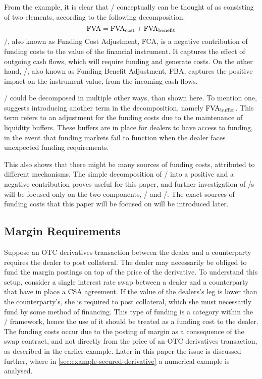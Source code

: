 \documentclass[main.tex]{subfiles}
\begin{document}
        From the example, it is clear that \FVA/ conceptually can be thought of 
        as consisting of two elements, according to the following decomposition:
        \begin{equation*}
            \FVA/ = \FCA/ + \FBA/
        \end{equation*}
        \FCA/, also known as Funding Cost Adjustment, FCA, 
        is a negative contribution of funding costs to the value of the financial instrument.
        It captures the effect of outgoing cash flows, which will require funding and generate costs.
        On the other hand, \FBA/, also known as Funding Benefit Adjustment, FBA, 
        captures the positive impact on the instrument value, from the incoming cash flows.

        \FVA/ could be decomposed in multiple other ways, than shown here. 
        To mention one, \textcite{KPMGFVA} suggests introducing another term in the decomposition, 
        namely $\FVA/_{\text{buffer}}$.
        This term refers to an adjustment for the funding costs
        due to the maintenance of liquidity buffers. 
        These buffers are in place for dealers to have access to funding, in the event
        that funding markets fail to function when the dealer faces unexpected funding requirements.

        This also shows that there might be many sources of funding costs,
        attributed to different mechanisms.
        The simple decomposition of \FVA/ into a positive and a negative contribution
        proves useful for this paper,
        and further investigation of \FVA/s will be focused only on the two components,
        \FCA/ and \FBA/.
        The exact sources of funding costs that this paper will be focused on
        will be introduced later.

        \subsection*{Margin Requirements}
            Suppose an OTC derivatives transaction between the dealer 
            and a counterparty requires the dealer to post collateral.
            The dealer may necessarily be obliged to fund the margin postings on top of the price of the derivative.
            To understand this setup,
            consider a single interest rate swap between a dealer and a counterparty that have in place a CSA agreement.
            If the value of the dealers's leg is lower than the counterparty's,
            she is required to post collateral, 
            which she must necessarily fund by some method of financing.
            This type of funding is a category within the \FVA/ framework, 
            hence the use of it should be treated as a funding cost to the dealer.
            The funding costs occur due to the posting of margin as a consequence of the swap contract,
            and not directly from the price of an OTC derivatives transaction,
            as described in the earlier example.
            Later in this paper the issue is discussed further, 
            where in \cref{sec:example-secured-derivative} a numerical example is analysed.
            
\end{document}
